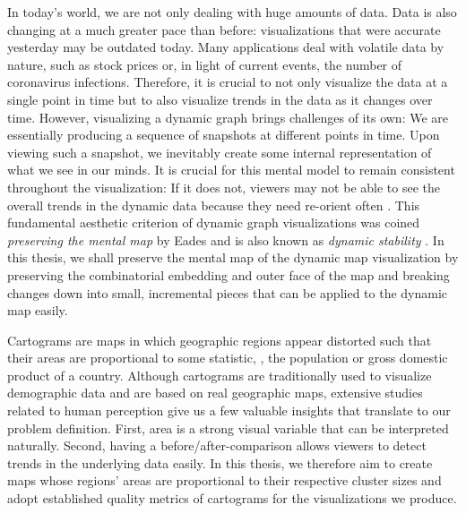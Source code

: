 In today's world, we are not only dealing with huge amounts of data.
Data is also changing at a much greater pace than before: visualizations that were accurate yesterday may be outdated today.
Many applications deal with volatile data by nature, such as stock prices or, in light of current events, the number of coronavirus infections.
Therefore, it is crucial to not only visualize the data at a single point in time but to also visualize trends in the data as it changes over time.
However, visualizing a dynamic graph brings challenges of its own:
We are essentially producing a sequence of snapshots at different points in time.
Upon viewing such a snapshot, we inevitably create some internal representation of what we see in our minds.
It is crucial for this mental model to remain consistent throughout the visualization:
If it does not, viewers may not be able to see the overall trends in the dynamic data because they need re-orient often \cite{bohringer1990using} \cite{lee2006mental} \cite{purchase2006important}.
This fundamental aesthetic criterion of dynamic graph visualizations was coined \emph{preserving the mental map} by Eades \etal{} \cite{eades1991preserving} \cite{misue1995layout} and is also known as \emph{dynamic stability} \cite{diehl2002graphs}.
In this thesis, we shall preserve the mental map of the dynamic map visualization by preserving the combinatorial embedding and outer face of the map and breaking changes down into small, incremental pieces that can be applied to the dynamic map easily.

Cartograms are maps in which geographic regions appear distorted such that their areas are proportional to some statistic, \eg{}, the population or gross domestic product of a country.
Although cartograms are traditionally used to visualize demographic data and are based on real geographic maps, extensive studies related to human perception \cite{nusrat2016state} \cite{nusrat2018evaluating} give us a few valuable insights that translate to our problem definition.
First, area is a strong visual variable that can be interpreted naturally.
Second, having a before/after-comparison allows viewers to detect trends in the underlying data easily.
In this thesis, we therefore aim to create maps whose regions' areas are proportional to their respective cluster sizes and adopt established quality metrics of cartograms for the visualizations we produce.

